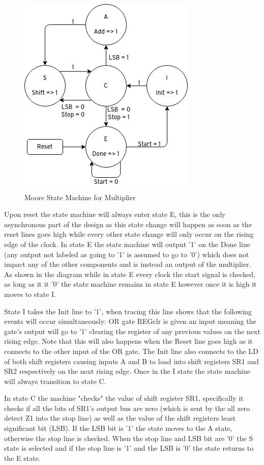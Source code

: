 \documentclass[11pt]{article}
\begin{document}
\begin{figure}[H]        
    \centering
    \includegraphics[width=.5\textwidth]{StateMachine.png}
    \caption{Moore State Machine for Multiplier}
    \label{fig:msm}
\end{figure} 

Upon reset the state machine will always enter state E,
this is the only asynchronous part of the design as this state change will happen as soon as the reset lines goes high while every other state change will only occur on the rising edge of the clock.
In state E the state machine will output '1' on the Done line (any output not labeled as going to '1' is assumed to go to '0') which does not impact any of the other components and is instead an output of the multiplier.
As shown in the diagram while in state E every clock the start signal is checked, as long as it it '0' the state machine remains in state E however once it is high it moves to state I.

State I takes the Init line to '1', when tracing this line shows that the following events will occur simultaneously: OR gate REGclr is given an input meaning the gate's output will go to '1' clearing the register of any previous values on the next rising edge.
Note that this will also happens when the Reset line goes high as it connects to the other input of the OR gate. 
The Init line also connects to the LD of both shift registers causing inputs A and B to load into shift registers SR1 and SR2 respectively on the next rising edge.
Once in the I state the state machine will always transition to state C. 

In state C the machine "checks" the value of shift register SR1,
specifically it checks if all the bits of SR1's output bus are zero (which is sent by the all zero detect Z1 into the stop line) as well as the value of the shift registers least significant bit (LSB).
If the LSB bit is '1' the state moves to the A state, otherwise the stop line is checked.
When the stop line and LSB bit are '0' the S state is selected and if the stop line is '1' and the LSB is '0' the state returns to the E state.
\end{document}
